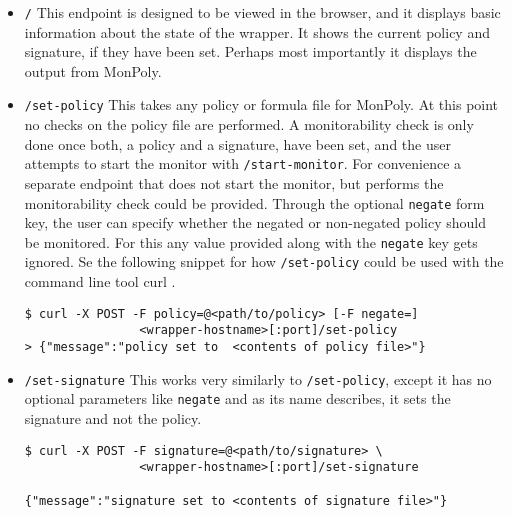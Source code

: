 \begin{itemize}
    \item \texttt{/}
    This endpoint is designed to be viewed in the browser, and it displays basic information about the state of the wrapper.
    It shows the current policy and signature, if they have been set.
    Perhaps most importantly it displays the output from MonPoly.

    \item \texttt{/set-policy}
    This takes any policy or formula file for MonPoly.
    At this point no checks on the policy file are performed.
    A monitorability check is only done once both, a policy and a signature, have been set, and the user attempts to start the monitor with \texttt{/start-monitor}.
    For convenience a separate endpoint that does not start the monitor, but performs the monitorability check could be provided.
    Through the optional \texttt{negate} form key, the user can specify whether the negated or non-negated policy should be monitored.
    For this any value provided along with the \texttt{negate} key gets ignored.
    Se the following snippet for how \texttt{/set-policy} could be used with the command line tool curl \cite{curl}.

    \begin{verbatim}
$ curl -X POST -F policy=@<path/to/policy> [-F negate=]
                <wrapper-hostname>[:port]/set-policy
> {"message":"policy set to  <contents of policy file>"}
    \end{verbatim}

    \item \texttt{/set-signature}
    This works very similarly to \texttt{/set-policy}, except it has no optional parameters like \texttt{negate} and as its name describes, it sets the signature and not the policy.
    \begin{verbatim}
$ curl -X POST -F signature=@<path/to/signature> \
                <wrapper-hostname>[:port]/set-signature

{"message":"signature set to <contents of signature file>"}
    \end{verbatim}


\end{itemize}

